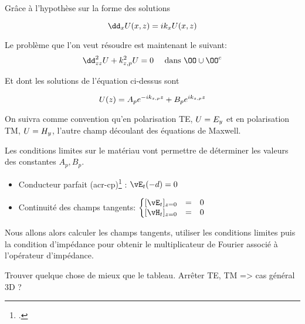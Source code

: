 


Grâce à l'hypothèse sur la forme des solutions

\[
\dd_{\x} U(\x,\z) = ik_\x U(\x,\z)
\]

Le problème que l'on veut résoudre est maintenant le suivant:
\begin{equation}
\dd_{\z\z}^2 U + k_{\z,p}^2 U = 0 \quad \text { dans \(\OO\cup\OO^c\)}
\end{equation}

Et dont les solutions de l'équation ci-dessus sont

\[
\hfill U(\z) = A_p e^{-ik_{\z,p} \z}  + B_p e^{ik_{\z,p} \z}
\]

On suivra comme convention qu'en polarisation TE, \( U = E_{y}\) et en polarisation TM, \( U = H_{y}\), l'autre champ découlant des équations de Maxwell.


Les conditions limites sur le matériau vont permettre de déterminer les valeurs des constantes \(A_p, B_p\).
\begin{itemize}
    \item
    Conducteur parfait (\gls{acr-cp})\footcite[p.~217]{morse_methods_1953} : \(\vE_t(-d) = 0  \)
    \item
    Continuité des champs tangents: \(
    \left\lbrace
    \begin{matrix}
    [ \vE_t]_{\z=0} &=& 0 \\
    [ \vH_t]_{\z=0} &=& 0
    \end{matrix}
    \right.\)
\end{itemize}

Nous allons alors calculer les champs tangents, utiliser les conditions limites puis la condition d'impédance pour obtenir le multiplicateur de Fourier associé à l'opérateur d'impédance.

\begin{TODO}
  Trouver quelque chose de mieux que le tableau. Arrêter TE, TM => cas général 3D ?
\end{TODO}

